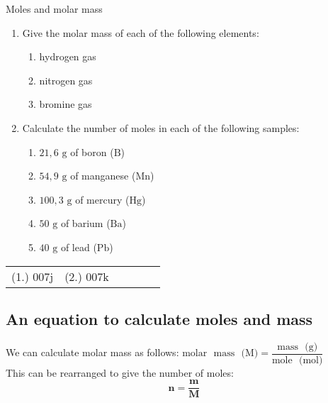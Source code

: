             \begin{exercises}{ Moles and molar mass
      }
            \nopagebreak \noindent \vspace{-2cm}
      \label{m38717*id277281}\begin{enumerate}[noitemsep, label=\textbf{\arabic*}. ] 
            \label{m38717*uid14}\item Give the molar mass of each of the following elements:
\label{m38717*id277295}\begin{enumerate}[noitemsep, label=\textbf{\alph*}. ] 
            \label{m38717*uid15}\item hydrogen gas
\label{m38717*uid16}\item nitrogen gas
\label{m38717*uid17}\item bromine gas
\end{enumerate}
                \label{m38717*uid18}\item Calculate the number of moles in each of the following samples:
\label{m38717*id277346}\begin{enumerate}[noitemsep, label=\textbf{\alph*}. ] 
            \label{m38717*uid19}\item $21,6 \text{ g}$ of boron ($\text{B}$)
\label{m38717*uid20}\item $54,9 \text{ g}$ of manganese ($\text{Mn}$)
\label{m38717*uid21}\item $100,3 \text{ g}$ of mercury ($\text{Hg}$)
\label{m38717*uid22}\item $50 \text{ g}$ of barium ($\text{Ba}$)
\label{m38717*uid23}\item $40 \text{ g}$ of lead ($\text{Pb}$)
\end{enumerate}
                \end{enumerate}
\practiceinfo
\par 
 \par \begin{tabular}[h]{cccccc}
 (1.) 007j  &  (2.) 007k  & \end{tabular}
\end{exercises}
            \subsection*{An equation to calculate moles and mass}
            \nopagebreak
      \label{m38717*id277432}We can calculate molar mass as follows:
$\text{molar ~mass ~(M)} = \dfrac{\text{mass ~(g)}}{\text{mole ~(mol)}}$ \\
This can be rearranged to give the number of moles:
      \label{m38717*id277436}\nopagebreak\noindent{}
    \begin{equation*}
    \mathbf{n} = \dfrac{\mathbf{m}}{\mathbf{M}}
      \end{equation*}

